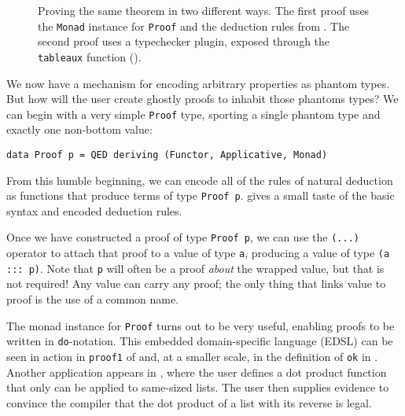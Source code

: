 \documentclass[format=sigplan, review=false, screen=true]{acmart}
\makeatletter
\let\origsubsection\subsection
\renewcommand\subsection{\@ifstar{\starsubsection}{\nostarsubsection}}
\newcommand\nostarsubsection[1]
{\subsectionprelude\origsubsection{#1}\subsectionpostlude}
\newcommand\starsubsection[1]
{\subsectionprelude\origsubsection*{#1}\subsectionpostlude}
\newcommand\subsectionprelude{%
  \vspace{-0.25em}
}
\newcommand\subsectionpostlude{%
  \vspace{-0.05em}
}
\makeatother
\begin{document}
\subsection{An EDSL for ghostly proofs}


\begin{figure}[b]
  \inputminted{haskell}{tableaux.hs}
  \caption{Proving the same theorem in two different ways. The first proof
    uses the \texttt{Monad} instance for
    \texttt{Proof} and the deduction rules from . The second
    proof uses a typechecker plugin, exposed through the \texttt{tableaux}
    function ().
    \label{tableaux-example}}
\end{figure}
We now have a mechanism for encoding arbitrary properties as phantom types. But how will the user
create ghostly proofs to inhabit those phantoms types?
We can begin with a very simple \texttt{Proof} type,
sporting a single phantom type and exactly one non-bottom value:
\begin{verbatim}
data Proof p = QED deriving (Functor, Applicative, Monad)
\end{verbatim} 
From this humble beginning, we can encode all of the rules of natural deduction as functions that
produce terms of type \texttt{Proof p}.
 gives a small taste of the basic syntax and encoded deduction rules.

Once we have constructed a proof of type \texttt{Proof p}, we can use the \texttt{(...)} operator to attach that proof to a value of type \texttt{a}, producing a value of type \verb|(a ::: p)|. Note that \texttt{p} will often be a proof \emph{about} the wrapped value,
but that is not required! Any value can carry any proof; the only thing that links value to proof is the use of a common name.


The monad instance for \texttt{Proof} turns out to be very useful, enabling proofs to be written in
\texttt{do}-notation. This embedded domain-specific language (EDSL) can be seen in action
in \texttt{proof1} of  and, at a smaller scale, in the
definition of \texttt{ok} in . Another application appears in , where the user defines a dot product function that only can be applied to same-sized lists.
The user then supplies evidence to convince the compiler that the dot product of a list with its reverse is legal.
\end{document}

